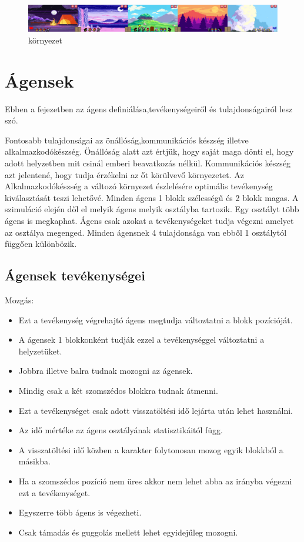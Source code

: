 \begin{figure}[!ht]
	\centering
	\includegraphics[width=\textwidth]{images/map.png}
    \caption{környezet}
    \label{fig:map}
\end{figure}
\section{Ágensek}

Ebben a fejezetben az ágens definiálása,tevékenységeiről és tulajdonságairól lesz szó.

Fontosabb tulajdonságai az önállóság,kommunikációs készség illetve alkalmazkodókészség. Önállóság alatt azt értjük, hogy saját maga dönti el, hogy adott helyzetben mit csinál emberi beavatkozás nélkül. Kommunikációs készség azt jelentené, hogy tudja érzékelni az őt körülvevő környezetet. Az Alkalmazkodókészség a változó környezet észlelésére optimális tevékenység kiválasztását teszi lehetővé.
\newline
Minden ágens 1 blokk szélességű és 2 blokk magas.
A szimuláció elején dől el melyik ágens melyik osztályba tartozik.
Egy osztályt több ágens is megkaphat.
Ágens csak azokat a tevékenységeket tudja végezni amelyet az osztálya megenged.
Minden ágensnek 4 tulajdonsága van ebből 1 osztálytól függően különbözik.

\subsection{Ágensek tevékenységei}

Mozgás:

\begin{itemize}
\item Ezt a tevékenység végrehajtó ágens megtudja változtatni a blokk pozícióját.
\item A ágensek 1 blokkonként tudják ezzel a tevékenységgel változtatni a helyzetüket.
\item Jobbra illetve balra tudnak mozogni az ágensek.
\item Mindig csak a két szomszédos blokkra tudnak átmenni.
\item Ezt a tevékenységet csak adott visszatöltési idő lejárta után lehet használni. 
\item Az idő mértéke az ágens osztályának statisztikáitól függ. 
\item A visszatöltési idő közben a karakter folytonosan mozog egyik blokkból a másikba.
\item Ha a szomszédos pozíció nem üres akkor nem lehet abba az irányba végezni ezt a tevékenységet.
\item Egyszerre több ágens is végezheti.
\item Csak támadás és guggolás mellett lehet egyidejűleg mozogni.
\end{itemize}

